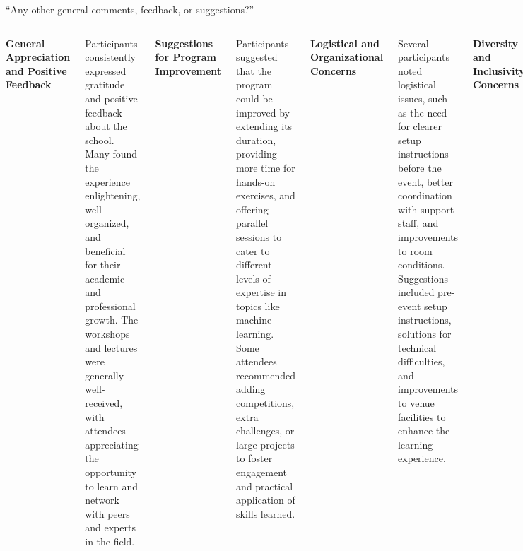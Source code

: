 \documentclass[aspectratio=169]{beamer}
\begin{document}
\begin{frame}{``Any other general comments, feedback, or suggestions?''}
\tiny
\vspace{0.45 cm}
\begin{columns}
{\bf\small General Appreciation and Positive Feedback}

\vspace{0.1 cm}
Participants consistently expressed gratitude and positive feedback about the school. Many found the experience enlightening, well-organized, and beneficial for their academic and professional growth. The workshops and lectures were generally well-received, with attendees appreciating the opportunity to learn and network with peers and experts in the field.

\vspace{0.2 cm}
{\bf\small Suggestions for Program Improvement}

\vspace{0.1 cm}
Participants suggested that the program could be improved by extending its duration, providing more time for hands-on exercises, and offering parallel sessions to cater to different levels of expertise in topics like machine learning. Some attendees recommended adding competitions, extra challenges, or large projects to foster engagement and practical application of skills learned.

\vspace{0.2 cm}
{\bf\small Logistical and Organizational Concerns}

\vspace{0.1 cm}
Several participants noted logistical issues, such as the need for clearer setup instructions before the event, better coordination with support staff, and improvements to room conditions. Suggestions included pre-event setup instructions, solutions for technical difficulties, and improvements to venue facilities to enhance the learning experience.

\vspace{0.2 cm}
{\bf\small Diversity and Inclusivity Concerns}

\vspace{0.1 cm}
There were concerns raised about diversity and inclusivity, particularly regarding gender and racial representation among participants and presenters. Suggestions included incorporating diversity statements and being mindful of inclusivity during all school activities to ensure a comfortable environment for everyone.

\vspace{0.2 cm}
{\bf\small Food and Accommodation Feedback}


\end{columns}
\end{frame}
\end{document}
